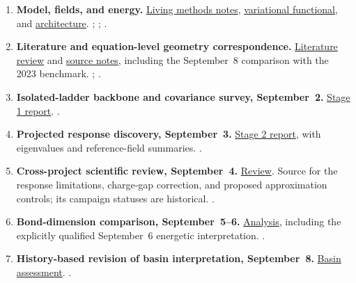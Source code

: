 \documentclass[11pt,letterpaper]{article}
\begin{document}
\begin{enumerate}
 \item\label{ev:methods}
 \textbf{Model, fields, and energy.}
 \href{run:../METHODS_NOTES.tex}{Living methods notes},
 \href{run:../VARIATIONAL_FUNCTIONAL.md}{variational functional}, and
 \href{run:../ARCHITECTURE.md}{architecture}.
 ;
 ; .

 \item\label{ev:geometry}
 \textbf{Literature and equation-level geometry correspondence.}
 \href{run:../literature/literature_review.pdf}{Literature review} and
 \href{run:../literature/SOURCE_NOTES.md}{source notes}, including the
 September~8 comparison with the 2023 benchmark.
 ;
 .

 \item\label{ev:bare}
 \textbf{Isolated-ladder backbone and covariance survey, September~2.}
 \href{run:../reports/bare_stage1_t014_v0_20260902/REPORT.md}{Stage 1 report}.
 .

 \item\label{ev:response}
 \textbf{Projected response discovery, September~3.}
 \href{run:../reports/bare_stage2_t014_v0_20260903/report.html}{Stage 2 report},
 with eigenvalues and reference-field summaries.
 .

 \item\label{ev:review}
 \textbf{Cross-project scientific review, September~4.}
 \href{run:../reports/systematic_review_20260904/REVIEW.md}{Review}.
 Source for the response limitations, charge-gap correction, and proposed
 approximation controls; its campaign statuses are historical.
 .

 \item\label{ev:chi}
 \textbf{Bond-dimension comparison, September~5--6.}
 \href{run:../reports/chi400_comparison_20260905/ANALYSIS.md}{Analysis},
 including the explicitly qualified September~6 energetic interpretation.
 .

 \item\label{ev:basins}
 \textbf{History-based revision of basin interpretation, September~8.}
 \href{run:../reports/square_grid_20260908/BASIN_ASSESSMENT.md}{Basin assessment}.
 .


\end{enumerate}
\end{document}
